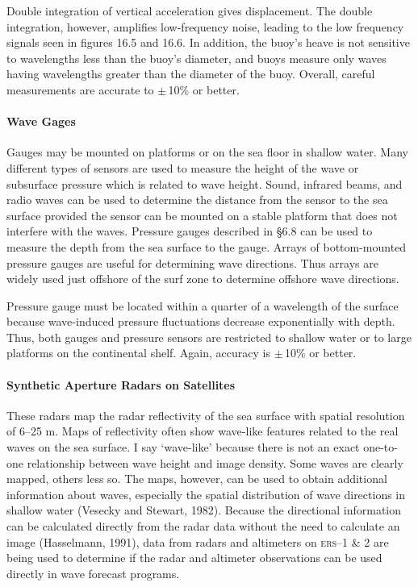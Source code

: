 Double integration of vertical acceleration gives displacement. The double integration, however, amplifies low-frequency noise, leading to the low frequency signals seen in figures 16.5 and 16.6. In addition, the buoy's heave is not sensitive to wavelengths less than the buoy's diameter, and buoys measure only waves having wavelengths greater than the diameter of the buoy. Overall, careful measurements are accurate to $\pm \,$10\% or better.

\paragraph{Wave Gages} Gauges may be mounted on platforms or on the sea floor in shallow water. Many different types of sensors are used to measure the height of the wave or subsurface pressure which is related to
wave height. Sound, infrared beams, and radio waves can be used to determine the distance from the sensor to the sea surface provided the sensor can be mounted on a stable platform that does not interfere with the waves. Pressure gauges described in
\S 6.8 can be used to measure the depth from the sea surface to the gauge. Arrays of bottom-mounted pressure gauges are useful for determining wave directions. Thus arrays are widely used just offshore of the surf zone to determine offshore wave directions.

Pressure gauge must be located within a quarter of a wavelength of the surface because wave-induced pressure fluctuations decrease exponentially with depth. Thus, both gauges and pressure sensors are restricted to shallow water or to large platforms on the continental shelf. Again, accuracy is $\pm \,$10\% or better.


\paragraph{Synthetic Aperture Radars on Satellites} These radars map the radar reflectivity of the sea surface with spatial resolution of 6--25 m. Maps of reflectivity often show wave-like features related
to the real waves on the sea surface. I say `wave-like' because there is not an exact one-to-one relationship between wave height and image density. Some waves are clearly mapped, others less so. The maps, however, can be used to obtain additional information about waves, especially the spatial distribution of wave directions in shallow water (Vesecky and Stewart, 1982). Because the directional information can be calculated directly from the radar data without the need to calculate an image (Hasselmann, 1991), data from radars and altimeters on \textsc{ers}--1 \& 2 are being used to determine if the radar and altimeter observations can be used directly in wave forecast programs.

